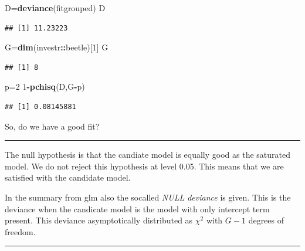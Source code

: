 \documentclass[
]{article}
\newenvironment{Shaded}{\begin{snugshade}}{\end{snugshade}}
\newcommand{\DecValTok}[1]{\textcolor[rgb]{0.00,0.00,0.81}{#1}}
\newcommand{\FunctionTok}[1]{\textcolor[rgb]{0.13,0.29,0.53}{\textbf{#1}}}
\newcommand{\NormalTok}[1]{#1}
\newcommand{\OtherTok}[1]{\textcolor[rgb]{0.56,0.35,0.01}{#1}}
\newcommand{\SpecialCharTok}[1]{\textcolor[rgb]{0.81,0.36,0.00}{\textbf{#1}}}
\begin{document}
\begin{Shaded}
\begin{Highlighting}[]
\NormalTok{D}\OtherTok{=}\FunctionTok{deviance}\NormalTok{(fitgrouped)}
\NormalTok{D}
\end{Highlighting}
\end{Shaded}

\begin{verbatim}
## [1] 11.23223
\end{verbatim}

\begin{Shaded}
\begin{Highlighting}[]
\NormalTok{G}\OtherTok{=}\FunctionTok{dim}\NormalTok{(investr}\SpecialCharTok{::}\NormalTok{beetle)[}\DecValTok{1}\NormalTok{]}
\NormalTok{G}
\end{Highlighting}
\end{Shaded}

\begin{verbatim}
## [1] 8
\end{verbatim}

\begin{Shaded}
\begin{Highlighting}[]
\NormalTok{p}\OtherTok{=}\DecValTok{2}
\DecValTok{1}\SpecialCharTok{{-}}\FunctionTok{pchisq}\NormalTok{(D,G}\SpecialCharTok{{-}}\NormalTok{p)}
\end{Highlighting}
\end{Shaded}

\begin{verbatim}
## [1] 0.08145881
\end{verbatim}

So, do we have a good fit?

\begin{center}\rule{0.5\linewidth}{0.5pt}\end{center}

The null hypothesis is that the candiate model is equally good as the
saturated model. We do not reject this hypothesis at level 0.05. This
means that we are satisfied with the candidate model.

In the summary from glm also the socalled \emph{NULL deviance} is given.
This is the deviance when the candicate model is the model with only
intercept term present. This deviance asymptotically distributed as
\(\chi^2\) with \(G-1\) degrees of freedom.

\begin{center}\rule{0.5\linewidth}{0.5pt}\end{center}
\end{document}
